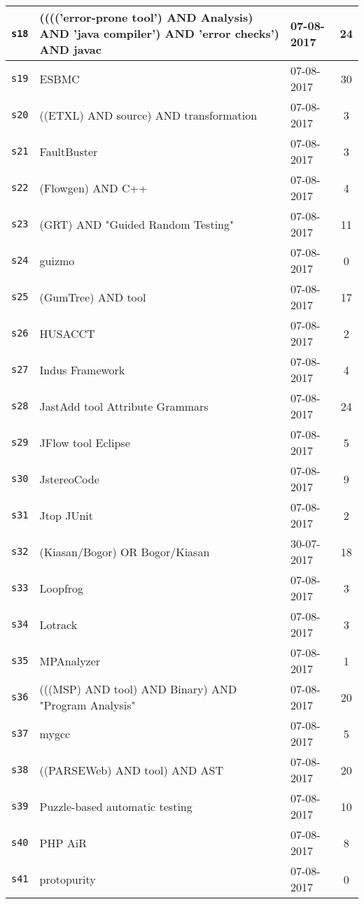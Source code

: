 \begin{longtable}{| l | p{13cm} | l | c |}
    \hline
\texttt{s18} & (((('error-prone tool') AND Analysis) AND 'java compiler') AND 'error checks') AND javac & 07-08-2017 & 24 \\
    \hline
\texttt{s19} & ESBMC & 07-08-2017 & 30 \\
    \hline
\texttt{s20} & ((ETXL) AND source) AND transformation & 07-08-2017 & 3 \\
    \hline
\texttt{s21} & FaultBuster & 07-08-2017 & 3 \\
    \hline
\texttt{s22} & (Flowgen) AND C++ & 07-08-2017 & 4 \\
    \hline
\texttt{s23} & (GRT) AND "Guided Random Testing" & 07-08-2017 & 11 \\
    \hline
\texttt{s24} & guizmo & 07-08-2017 & 0 \\
    \hline
\texttt{s25} & (GumTree) AND tool & 07-08-2017 & 17 \\
    \hline
\texttt{s26} & HUSACCT & 07-08-2017 & 2 \\
    \hline
\texttt{s27} & Indus Framework & 07-08-2017 & 4 \\
    \hline
\texttt{s28} & JastAdd tool Attribute Grammars & 07-08-2017 & 24 \\
    \hline
\texttt{s29} & JFlow tool Eclipse & 07-08-2017 & 5 \\
    \hline
\texttt{s30} & JstereoCode & 07-08-2017 & 9 \\
    \hline
\texttt{s31} & Jtop JUnit & 07-08-2017 & 2 \\
    \hline
\texttt{s32} & (Kiasan/Bogor) OR Bogor/Kiasan & 30-07-2017 & 18 \\
    \hline
\texttt{s33} & Loopfrog & 07-08-2017 & 3 \\
    \hline
\texttt{s34} & Lotrack & 07-08-2017 & 3 \\
    \hline
\texttt{s35} & MPAnalyzer & 07-08-2017 & 1 \\
    \hline
\texttt{s36} & (((MSP) AND tool) AND Binary) AND "Program Analysis" & 07-08-2017 & 20 \\
    \hline
\texttt{s37} & mygcc & 07-08-2017 & 5 \\
    \hline
\texttt{s38} & ((PARSEWeb) AND tool) AND AST & 07-08-2017 & 20 \\
    \hline
\texttt{s39} & Puzzle-based automatic testing & 07-08-2017 & 10 \\
    \hline
\texttt{s40} & PHP AiR & 07-08-2017 & 8 \\
    \hline
\texttt{s41} & protopurity & 07-08-2017 & 0 \\
    \hline

\end{longtable}
